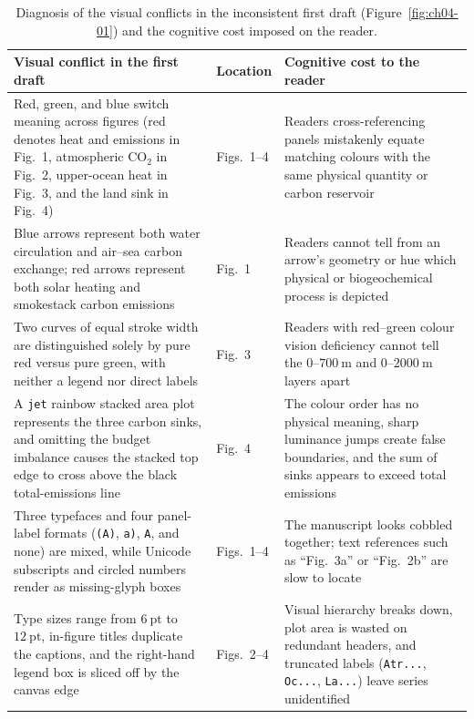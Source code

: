 \begin{table}[htbp]\centering\footnotesize
\setlength{\tabcolsep}{3pt}
\renewcommand{\arraystretch}{1.15}
\caption{Diagnosis of the visual conflicts in the inconsistent first draft (Figure~\ref{fig:ch04-01}) and the cognitive cost imposed on the reader.}\label{tab:ch04-diag}
\begin{tabularx}{\linewidth}{@{}Y>{\raggedright\arraybackslash}p{18mm}Y@{}}
\toprule
\textbf{Visual conflict in the first draft} & \textbf{Location} & \textbf{Cognitive cost to the reader} \\
\midrule
Red, green, and blue switch meaning across figures (red denotes heat and emissions in Fig.\ 1, atmospheric $\text{CO}_2$ in Fig.\ 2, upper-ocean heat in Fig.\ 3, and the land sink in Fig.\ 4) & Figs.\ 1--4 & Readers cross-referencing panels mistakenly equate matching colours with the same physical quantity or carbon reservoir \\
Blue arrows represent both water circulation and air--sea carbon exchange; red arrows represent both solar heating and smokestack carbon emissions & Fig.\ 1 & Readers cannot tell from an arrow's geometry or hue which physical or biogeochemical process is depicted \\
Two curves of equal stroke width are distinguished solely by pure red versus pure green, with neither a legend nor direct labels & Fig.\ 3 & Readers with red--green colour vision deficiency cannot tell the $0\text{--}700\ \text{m}$ and $0\text{--}2000\ \text{m}$ layers apart \\
A \texttt{jet} rainbow stacked area plot represents the three carbon sinks, and omitting the budget imbalance causes the stacked top edge to cross above the black total-emissions line & Fig.\ 4 & The colour order has no physical meaning, sharp luminance jumps create false boundaries, and the sum of sinks appears to exceed total emissions \\
Three typefaces and four panel-label formats (\texttt{(A)}, \texttt{a)}, \texttt{A}, and none) are mixed, while Unicode subscripts and circled numbers render as missing-glyph boxes & Figs.\ 1--4 & The manuscript looks cobbled together; text references such as ``Fig.\ 3a'' or ``Fig.\ 2b'' are slow to locate \\
Type sizes range from $6\ \text{pt}$ to $12\ \text{pt}$, in-figure titles duplicate the captions, and the right-hand legend box is sliced off by the canvas edge & Figs.\ 2--4 & Visual hierarchy breaks down, plot area is wasted on redundant headers, and truncated labels (\texttt{Atr...}, \texttt{Oc...}, \texttt{La...}) leave series unidentified \\

\end{tabularx}
\end{table}

